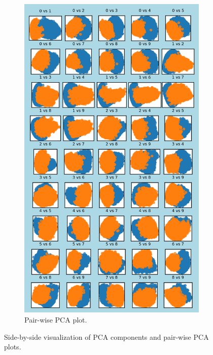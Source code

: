 \documentclass{article}
\begin{document}
\begin{figure}[h!]
\begin{subfigure}[t]{0.45\textwidth}
        \centering
        \includegraphics[width=\textwidth]{./plots/plot3.png}
        \caption{Pair-wise PCA plot.}
        \label{fig:plot2b}
    \end{subfigure}
    \caption{Side-by-side visualization of PCA components and pair-wise PCA plots.}
    \label{fig:side_by_side}
\end{figure}
\end{document}
